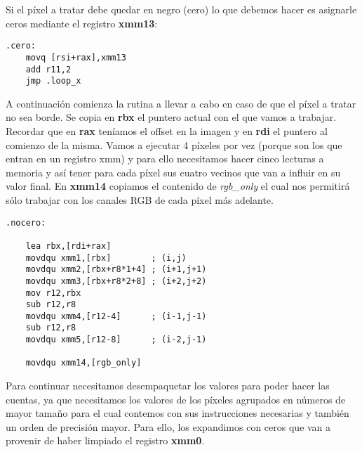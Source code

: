 \documentclass[a4paper]{article}
\begin{document}
\newpage
\indent Si el p\'ixel a tratar debe quedar en negro (cero) lo que debemos hacer es asignarle ceros mediante el registro \textbf{xmm13}:
 \begin{codesnippet}
\begin{verbatim}
.cero:
    movq [rsi+rax],xmm13        
    add r11,2
    jmp .loop_x
\end{verbatim}
\end{codesnippet}

A continuaci\'on comienza la rutina a llevar a cabo en caso de que el p\'ixel a tratar no sea borde. Se copia en \textbf{rbx} el puntero actual con el que vamos a trabajar. Recordar que en \textbf{rax} ten\'iamos el offset en la imagen y en \textbf{rdi} el puntero al comienzo de la misma. Vamos a ejecutar 4 p\'ixeles por vez (porque son los que entran en un registro xmm) y para ello necesitamos hacer cinco lecturas a memoria y as\'i tener para cada p\'ixel sus cuatro vecinos que van a influir en su valor final. En \textbf{xmm14} copiamos el contenido de \textit{rgb_only} el cual nos permitir\'a s\'olo trabajar con los canales RGB de cada p\'ixel m\'as adelante.
 \begin{codesnippet}
\begin{verbatim}
.nocero:
    
    lea rbx,[rdi+rax]
    movdqu xmm1,[rbx]        ; (i,j)
    movdqu xmm2,[rbx+r8*1+4] ; (i+1,j+1)
    movdqu xmm3,[rbx+r8*2+8] ; (i+2,j+2)
    mov r12,rbx
    sub r12,r8
    movdqu xmm4,[r12-4]      ; (i-1,j-1)
    sub r12,r8
    movdqu xmm5,[r12-8]      ; (i-2,j-1)

    movdqu xmm14,[rgb_only]
\end{verbatim}
\end{codesnippet}

\indent Para continuar necesitamos desempaquetar los valores para poder hacer las cuentas, ya que necesitamos los valores de los p\'ixeles agrupados en n\'umeros de mayor tama\~no para el cual contemos con sus instrucciones necesarias y tambi\'en un orden de precisi\'on mayor. Para ello, los expandimos con ceros que van a provenir de haber limpiado el registro \textbf{xmm0}.
\end{document}
